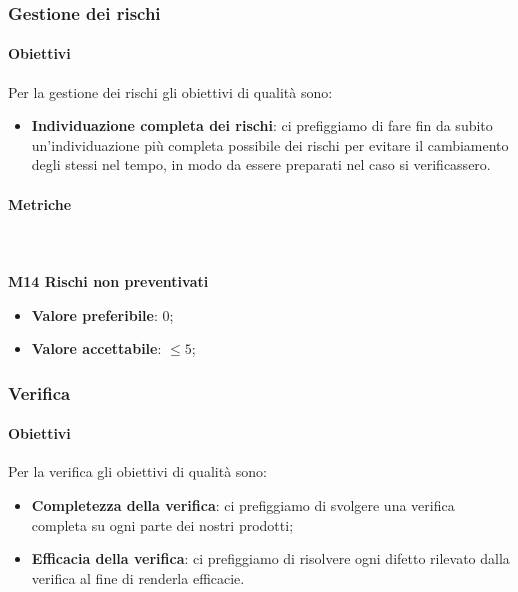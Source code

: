		\subsubsection{Gestione dei rischi} 
			\paragraph{Obiettivi}
			Per la gestione dei rischi gli obiettivi di qualità sono:
			\begin{itemize}
				\item \textbf{Individuazione completa dei rischi}: ci prefiggiamo di fare fin da subito un'individuazione più completa possibile dei rischi per evitare il cambiamento degli stessi nel tempo, in modo da essere preparati nel caso si verificassero.
			\end{itemize}
			\paragraph{Metriche} \mbox{} \\ \\
			\textbf{M14 Rischi non preventivati} 
			\begin{itemize}
				\item \textbf{Valore preferibile}: 0;
				\item \textbf{Valore accettabile}: $ \le 5$;
			\end{itemize}

		\subsubsection{Verifica}
		\paragraph{Obiettivi}
		Per la verifica gli obiettivi di qualità sono:
		\begin{itemize}
			\item \textbf{Completezza della verifica}: ci prefiggiamo di svolgere una verifica completa su ogni parte dei nostri prodotti;
			\item \textbf{Efficacia della verifica}: ci prefiggiamo di risolvere ogni difetto rilevato dalla verifica al fine di renderla efficacie.
		\end{itemize}
